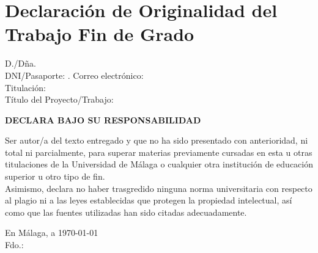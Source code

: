 \chapter*{Declaración de Originalidad del Trabajo Fin de Grado}

\begin{flushleft}
    {\fontsize{13}{30} D./Dña. \tfgAuthor \\}
    \bigskip
    {\fontsize{13}{15} DNI/Pasaporte: \tfgNIF. Correo electrónico: \tfgEmail\\}
    \bigskip
    {\fontsize{13}{15} Titulación: \tfgGrade\\}
    \bigskip
    {\fontsize{13}{15} Título del Proyecto/Trabajo: \tfgTitle\\}
    \bigskip
\end{flushleft}

\begin{center}
    {\LARGE \textbf{DECLARA BAJO SU RESPONSABILIDAD\\}}
    \bigskip
\end{center}

Ser autor/a del texto entregado y que no ha sido presentado con anterioridad, ni total ni parcialmente, para superar materias previamente cursadas en esta u otras titulaciones de la Universidad de Málaga o cualquier otra institución de educación superior u otro tipo de fin.\\


Asimismo, declara no haber trasgredido ninguna norma universitaria con respecto al plagio ni a las leyes establecidas que protegen la propiedad intelectual, así como que las fuentes utilizadas han sido citadas adecuadamente.

\vspace{1cm}


\begin{flushright}
    {\fontsize{14}{40} En Málaga, a \today\\}
    \vspace{2cm}
    {\fontsize{14}{30}\textsf Fdo.: \tfgAuthor}
\end{flushright}


